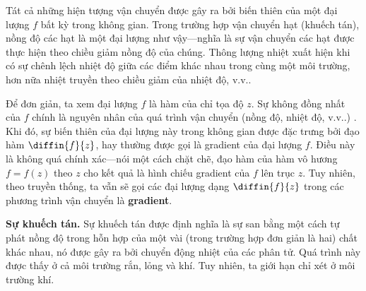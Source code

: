 Tát cả những hiện tượng vận chuyển được gây ra bởi biến thiên của một đại lượng $f$ bất kỳ trong không gian. Trong trường hợp vận chuyển hạt (khuếch tán), nồng độ các hạt là một đại lượng như vậy---nghĩa là sự vận chuyển các hạt được thực hiện theo chiều giảm nồng độ của chúng. Thông lượng nhiệt xuất hiện khi có sự chênh lệch nhiệt độ giữa các điểm khác nhau trong cùng một môi trường, hơn nữa nhiệt truyền theo chiều giảm của nhiệt độ, v.v..

Để đơn giản, ta xem  đại lượng $f$ là hàm của chỉ tọa độ $z$. Sự không đồng nhất của $f$ chính là nguyên nhân của quá trình vận chuyển (nồng độ, nhiệt độ, v.v..) . Khi đó, sự biến thiên của đại lượng này trong không gian được đặc trưng bởi đạo hàm $\diffin{f}{z}$, hay thường được gọi là gradient của đại lượng $f$. Điều này là không quá chính xác---nói một cách chặt chẽ, đạo hàm của hàm vô hương $f=f(z)$ theo $z$ cho kết quả là hình chiếu gradient của $f$ lên trục $z$. Tuy nhiên, theo truyền thống, ta vẫn sẽ gọi các đại lượng dạng $\diffin{f}{z}$ trong các phương trình vận chuyển là \textbf{gradient}.

\textbf{Sự khuếch tán.} Sự khuếch tán được định nghĩa là sự san bằng một cách tự phát nồng độ trong hỗn hợp của một vài (trong trường hợp đơn giản là hai) chất khác nhau, nó được gây ra bởi chuyển động nhiệt của các phân tử. Quá trình này được thấy ở cả môi trường rắn, lỏng và khí. Tuy nhiên, ta giới hạn chỉ xét ở môi trường khí.

